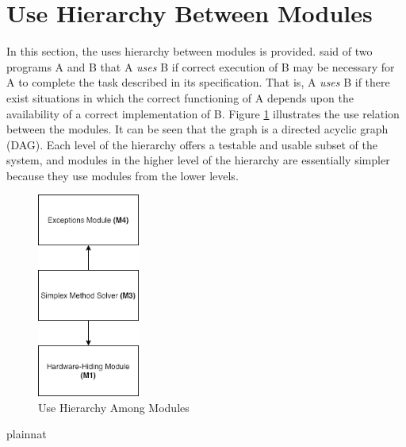 \documentclass[12pt, titlepage]{article}
\begin{document}
\section{Use Hierarchy Between Modules} \label{SecUse}

In this section, the uses hierarchy between modules is
provided. \citet{Parnas1978} said of two programs A and B that A {\em uses} B if
correct execution of B may be necessary for A to complete the task described in
its specification. That is, A {\em uses} B if there exist situations in which
the correct functioning of A depends upon the availability of a correct
implementation of B.  Figure \ref{FigUH} illustrates the use relation between
the modules. It can be seen that the graph is a directed acyclic graph
(DAG). Each level of the hierarchy offers a testable and usable subset of the
system, and modules in the higher level of the hierarchy are essentially simpler
because they use modules from the lower levels.

\begin{figure}[H]
\centering
\includegraphics[width=0.3\textwidth]{UsesHierarchy.png}
\caption{Use Hierarchy Among Modules}
\label{FigUH}
\end{figure}


\newpage

 {plainnat}

\end{document}
